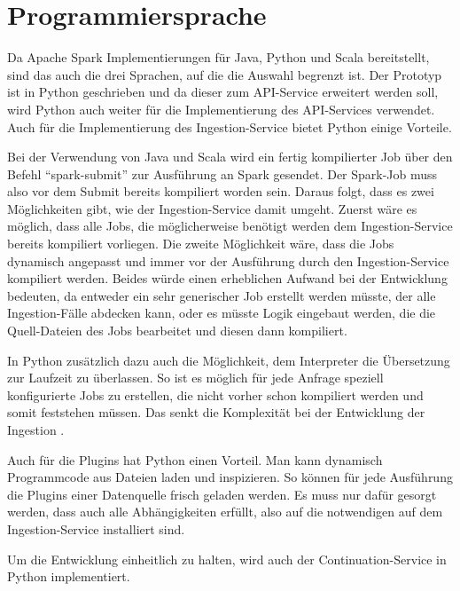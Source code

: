 \section{Programmiersprache}

Da Apache Spark Implementierungen für Java, Python und Scala bereitstellt, sind das auch die drei Sprachen, auf die die Auswahl begrenzt ist.
Der Prototyp ist in Python geschrieben und da dieser zum API-Service erweitert werden soll, wird Python auch weiter für die Implementierung des API-Services verwendet.
Auch für die Implementierung des Ingestion-Service bietet Python einige Vorteile.

Bei der Verwendung von Java und Scala wird ein fertig kompilierter Job über den Befehl "`spark-submit"' zur Ausführung an Spark gesendet.
Der Spark-Job muss also vor dem Submit bereits kompiliert worden sein.
Daraus folgt, dass es zwei Möglichkeiten gibt, wie der Ingestion-Service damit umgeht.
Zuerst wäre es möglich, dass alle Jobs, die möglicherweise benötigt werden dem Ingestion-Service bereits kompiliert vorliegen.
Die zweite Möglichkeit wäre, dass die Jobs dynamisch angepasst und immer vor der Ausführung durch den Ingestion-Service kompiliert werden.
Beides würde einen erheblichen Aufwand bei der Entwicklung bedeuten, da entweder ein sehr generischer Job erstellt werden müsste, der alle Ingestion-Fälle abdecken kann, oder es müsste Logik eingebaut werden, die die Quell-Dateien des Jobs bearbeitet und diesen dann kompiliert.

In Python zusätzlich dazu auch die Möglichkeit, dem Interpreter die Übersetzung zur Laufzeit zu überlassen.
So ist es möglich für jede Anfrage speziell konfigurierte Jobs zu erstellen, die nicht vorher schon kompiliert werden und somit feststehen müssen.
Das senkt die Komplexität bei der Entwicklung der Ingestion \parencite{pyspark-int}.

Auch für die Plugins hat Python einen Vorteil.
Man kann dynamisch Programmcode aus Dateien laden und inspizieren.
So können für jede Ausführung die Plugins einer Datenquelle frisch geladen werden.
Es muss nur dafür gesorgt werden, dass auch alle Abhängigkeiten erfüllt, also auf die notwendigen auf dem Ingestion-Service installiert sind.

Um die Entwicklung einheitlich zu halten, wird auch der Continuation-Service in Python implementiert.